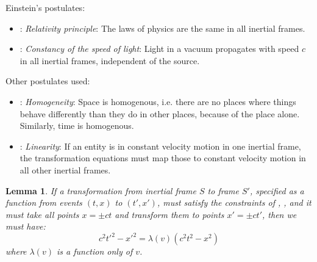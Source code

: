 \documentclass[a4paper]{article}
\theoremstyle{plain}
\newtheorem{lemma}[theorem]{Lemma}
\theoremstyle{definition}
\begin{document}
Einstein's postulates:
\begin{itemize}
\item \erp: {\em Relativity principle}: The laws of physics are the
  same in all inertial frames.
\item \esol: {\em Constancy of the speed of light}: Light in a vacuum
  propagates with speed $c$ in all inertial frames, independent of the
  source.
\end{itemize}
Other postulates used:
\begin{itemize}
\item \homogeneity: {\em Homogeneity}: Space is homogenous, i.e. there
  are no places where things behave differently than they do in other
  places, because of the place alone.  Similarly, time is homogenous.
\item \linearity: {\em Linearity}: If an entity is in constant
  velocity motion in one inertial frame, the transformation equations
  must map those to constant velocity motion in all other inertial
  frames.
\end{itemize}

\begin{lemma}
  If a transformation from inertial frame $S$ to frame $S'$,
  specified as a function from events $(t, x)$ to $(t', x')$, must
  satisfy the constraints of \homogeneity, \linearity,
  and it must take all points $x = \pm ct$ and transform them to
  points $x' = \pm ct'$, then we must have:
\begin{equation}
c^2 t'^2 - x'^2 = \lambda(v) (c^2 t^2 - x^2)
\end{equation}
where $\lambda(v)$ is a function only of $v$.
\end{lemma}
\end{document}
